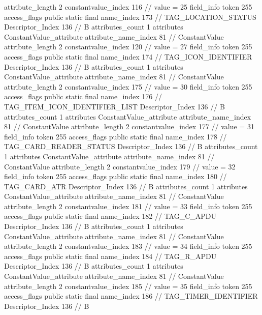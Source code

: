 {{{{{{{					attribute_length	2
					constantvalue_index	116		// value = 25
				}
				}
			}
			field_info {
				token	255
				access_flags	public static final
				name_index	173		// TAG_LOCATION_STATUS
				Descriptor_Index	136		// B
				attributes_count	1
				attributes {
				ConstantValue_attribute {
					attribute_name_index	81		// ConstantValue
					attribute_length	2
					constantvalue_index	120		// value = 27
				}
				}
			}
			field_info {
				token	255
				access_flags	public static final
				name_index	174		// TAG_ICON_IDENTIFIER
				Descriptor_Index	136		// B
				attributes_count	1
				attributes {
				ConstantValue_attribute {
					attribute_name_index	81		// ConstantValue
					attribute_length	2
					constantvalue_index	175		// value = 30
				}
				}
			}
			field_info {
				token	255
				access_flags	public static final
				name_index	176		// TAG_ITEM_ICON_IDENTIFIER_LIST
				Descriptor_Index	136		// B
				attributes_count	1
				attributes {
				ConstantValue_attribute {
					attribute_name_index	81		// ConstantValue
					attribute_length	2
					constantvalue_index	177		// value = 31
				}
				}
			}
			field_info {
				token	255
				access_flags	public static final
				name_index	178		// TAG_CARD_READER_STATUS
				Descriptor_Index	136		// B
				attributes_count	1
				attributes {
				ConstantValue_attribute {
					attribute_name_index	81		// ConstantValue
					attribute_length	2
					constantvalue_index	179		// value = 32
				}
				}
			}
			field_info {
				token	255
				access_flags	public static final
				name_index	180		// TAG_CARD_ATR
				Descriptor_Index	136		// B
				attributes_count	1
				attributes {
				ConstantValue_attribute {
					attribute_name_index	81		// ConstantValue
					attribute_length	2
					constantvalue_index	181		// value = 33
				}
				}
			}
			field_info {
				token	255
				access_flags	public static final
				name_index	182		// TAG_C_APDU
				Descriptor_Index	136		// B
				attributes_count	1
				attributes {
				ConstantValue_attribute {
					attribute_name_index	81		// ConstantValue
					attribute_length	2
					constantvalue_index	183		// value = 34
				}
				}
			}
			field_info {
				token	255
				access_flags	public static final
				name_index	184		// TAG_R_APDU
				Descriptor_Index	136		// B
				attributes_count	1
				attributes {
				ConstantValue_attribute {
					attribute_name_index	81		// ConstantValue
					attribute_length	2
					constantvalue_index	185		// value = 35
				}
				}
			}
			field_info {
				token	255
				access_flags	public static final
				name_index	186		// TAG_TIMER_IDENTIFIER
				Descriptor_Index	136		// B
}}}}}
